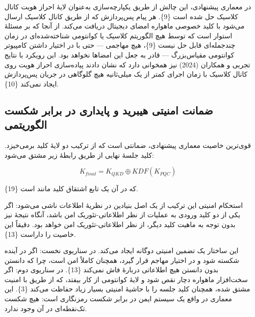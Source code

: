 \documentclass[a4paper,14pt]{extreport}
\begin{document}
در معماری پیشنهادی، این چالش از طریق یکپارچه‌سازی  به‌عنوان لایهٔ احراز هویت کانال کلاسیک حل شده است \{9\}. هر پیام پس‌پردازش  که از طریق کانال کلاسیک ارسال می‌شود با کلید خصوصی  ماهواره امضای دیجیتال دریافت می‌کند. از آنجا که  بر مسئلهٔ  استوار است که توسط هیچ الگوریتم کلاسیک یا کوانتومی شناخته‌شده‌ای در زمان چندجمله‌ای قابل حل نیست \{9\}، هیچ مهاجمی --- حتی با در اختیار داشتن کامپیوتر کوانتومی مقیاس‌بزرگ --- قادر به جعل این امضاها نخواهد بود. این رویکرد با نتایج تجربی  و همکاران (2024) نیز همخوانی دارد که نشان دادند پیاده‌سازی احراز هویت  روی کانال کلاسیک با زمان اجرای کمتر از یک میلی‌ثانیه هیچ گلوگاهی در جریان پس‌پردازش  ایجاد نمی‌کند \{10\}.

\subsection{ضمانت امنیتی هیبرید و پایداری در برابر شکست الگوریتمی}

قوی‌ترین خاصیت معماری پیشنهادی، ضمانتی است که از ترکیب دو لایهٔ کلید برمی‌خیزد. کلید جلسهٔ نهایی از طریق رابطهٔ زیر مشتق می‌شود:

\begin{equation}
K_{final} = K_{QKD} \oplus KDF(K_{PQC})
\label{eq:hybrid_key}
\end{equation}

که در آن  یک تابع اشتقاق کلید مانند  است \{19\}.

استحکام امنیتی این ترکیب از یک اصل بنیادین در نظریهٔ اطلاعات  ناشی می‌شود: اگر یکی از دو کلید ورودی به عملیات  از نظر اطلاعاتی-تئوریک امن باشد، آنگاه نتیجهٔ  نیز بدون توجه به ماهیت کلید دیگر، از نظر اطلاعاتی-تئوریک امن خواهد بود.  دقیقاً این خاصیت را داراست \{13\}.

این ساختار یک تضمین امنیتی دوگانه ایجاد می‌کند. در سناریوی نخست: اگر  در آینده شکسته شود و  در اختیار مهاجم قرار گیرد،  همچنان کاملاً امن است، چرا که دانستن  بدون دانستن  هیچ اطلاعاتی دربارهٔ  فاش نمی‌کند \{13\}. در سناریوی دوم: اگر سخت‌افزار  ماهواره دچار نقص شود و لایهٔ کوانتومی از کار بیفتد،  که از طریق  با امنیت  مشتق شده، همچنان کلید جلسه را با حاشیهٔ امنیتی بسیار زیاد حفاظت می‌کند \{3\}. این معماری در واقع یک سیستم ایمن در برابر شکست  رمزنگاری است: هیچ شکست تک‌نقطه‌ای  در آن وجود ندارد.
\end{document}
